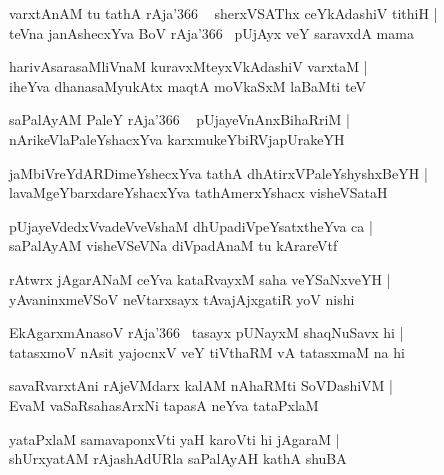 \documentclass[twoside,12pt,openright]{book}
\newcounter{shloka}[chapter]
\begin{document}
\begin{shloka}%
varxtAnAM tu tathA rAja\char'366 ~ sherxVSAThx ceYkAdashiV tithiH |\\
teVna janAshecxYva BoV rAja\char'366~ pUjAyx veY saravxdA mama
\end{shloka}

\begin{shloka}%
harivAsarasaMliVnaM kuravxMteyxVkAdashiV varxtaM |\\
iheYva dhanasaMyukAtx maqtA moVkaSxM laBaMti teV 
\end{shloka}

\begin{shloka}%
saPalAyAM PaleY rAja\char'366 ~ pUjayeVnAnxBihaRriM |\\
nArikeVlaPaleYshacxYva karxmukeYbiRVjapUrakeYH
\end{shloka}

\begin{shloka}%
jaMbiVreYdARDimeYshecxYva tathA dhAtirxVPaleYshyshxBeYH |\\
lavaMgeYbarxdareYshacxYva tathAmerxYshacx visheVSataH
\end{shloka}

\begin{shloka}%
pUjayeVdedxVvadeVveVshaM dhUpadiVpeYsatxtheYva ca |\\
saPalAyAM visheVSeVNa diVpadAnaM tu kArareVtf
\end{shloka}

\begin{shloka}%
rAtwrx jAgarANaM ceYva kataRvayxM saha veYSaNxveYH |\\
yAvaninxmeVSoV neVtarxsayx tAvajAjxgatiR yoV nishi
\end{shloka}

\begin{shloka}%
EkAgarxmAnasoV rAja\char'366 ~tasayx pUNayxM shaqNuSavx hi |\\
tatasxmoV nAsit yajocnxV veY tiVthaRM vA tatasxmaM na hi
\end{shloka}

\begin{shloka}%
savaRvarxtAni rAjeVMdarx kalAM nAhaRMti SoVDashiVM |\\
EvaM vaSaRsahasArxNi tapasA neYva tataPxlaM 
\end{shloka}

\begin{shloka}%
yataPxlaM  samavaponxVti yaH karoVti hi jAgaraM |\\
shUrxyatAM rAjashAdURla saPalAyAH kathA shuBA
\end{shloka}
\end{document}

